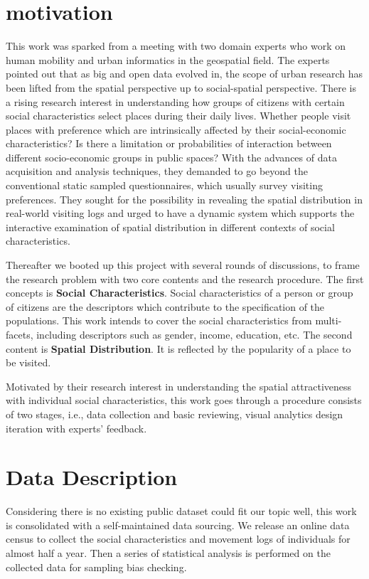 \documentclass{ieeeaccess}
\begin{document}
\section{motivation}

\label{sec:concept}
This work was sparked from a meeting with two domain experts who work on human mobility and urban informatics in the geospatial field. The experts pointed out that as big and open data evolved in, the scope of urban research has been lifted from the spatial perspective up to social-spatial perspective. There is a rising research interest in understanding how groups of citizens with certain social characteristics select places during their daily lives. Whether people visit places with preference which are intrinsically affected by their social-economic characteristics? Is there a limitation or probabilities of interaction between different socio-economic groups in public spaces? With the advances of data acquisition and analysis techniques, they demanded to go beyond the conventional static sampled questionnaires, which usually survey visiting preferences. They sought for the possibility in revealing the spatial distribution in real-world visiting logs and urged to have a dynamic system which supports the interactive examination of spatial distribution in different contexts of social characteristics.

Thereafter we booted up this project with several rounds of discussions, to frame the research problem with two core contents and the research procedure. The first concepts is \textbf{Social Characteristics}.  Social characteristics of a person or group of citizens  are the descriptors which contribute to the specification of the populations. This work intends to cover the social characteristics from multi-facets, including descriptors such as gender, income, education, etc. The second content is \textbf{Spatial Distribution}. It is reflected by the popularity of a place to be visited.

Motivated by their research interest in understanding the spatial attractiveness with individual social characteristics, this work goes through a procedure consists of two stages, i.e., data collection and basic reviewing, visual analytics design iteration with experts' feedback.

\section{Data Description}
\label{subsec:pipeline}
Considering there is no existing public dataset could fit our topic well, this work is consolidated with a self-maintained data sourcing. We release an online data census to collect the social characteristics and movement logs of individuals for almost half a year. Then a series of statistical analysis is performed on the collected data for sampling bias checking.
\end{document}
